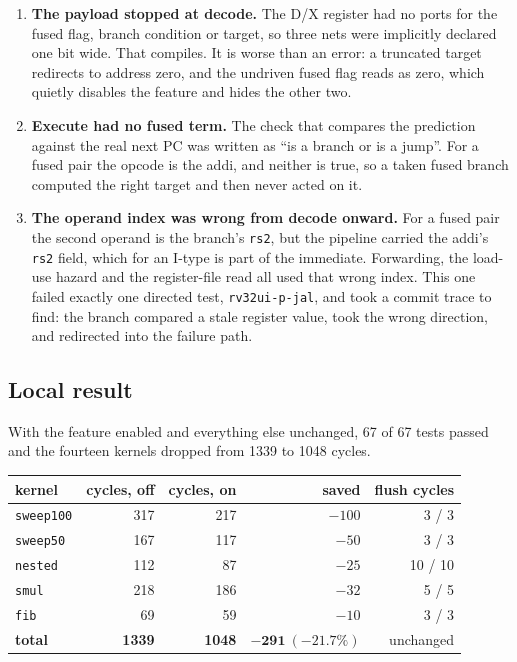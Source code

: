 \documentclass[11pt]{article}
\begin{document}
\begin{enumerate}
\item \textbf{The payload stopped at decode.} The D/X register had no ports for the fused flag,
  branch condition or target, so three nets were implicitly declared one bit wide. That
  compiles. It is worse than an error: a truncated target redirects to address zero, and the
  undriven fused flag reads as zero, which quietly disables the feature and hides the other two.
\item \textbf{Execute had no fused term.} The check that compares the prediction against the
  real next PC was written as ``is a branch or is a jump''. For a fused pair the opcode is the
  addi, and neither is true, so a taken fused branch computed the right target and then never
  acted on it.
\item \textbf{The operand index was wrong from decode onward.} For a fused pair the second
  operand is the branch's \texttt{rs2}, but the pipeline carried the addi's \texttt{rs2} field,
  which for an I-type is part of the immediate. Forwarding, the load-use hazard and the
  register-file read all used that wrong index. This one failed exactly one directed test,
  \texttt{rv32ui-p-jal}, and took a commit trace to find: the branch compared a stale register
  value, took the wrong direction, and redirected into the failure path.
\end{enumerate}

\subsection{Local result}

With the feature enabled and everything else unchanged, 67 of 67 tests passed and the fourteen
kernels dropped from 1339 to 1048 cycles.

\begin{center}
\begin{tabular}{lrrrr}
\toprule
kernel & cycles, off & cycles, on & saved & flush cycles \\
\midrule
\texttt{sweep100} & 317 & 217 & $-100$ & 3 / 3 \\
\texttt{sweep50}  & 167 & 117 & $-50$ & 3 / 3 \\
\texttt{nested}   & 112 &  87 & $-25$ & 10 / 10 \\
\texttt{smul}     & 218 & 186 & $-32$ & 5 / 5 \\
\texttt{fib}      &  69 &  59 & $-10$ & 3 / 3 \\
\textbf{total}    & \textbf{1339} & \textbf{1048} & $\mathbf{-291\ (-21.7\%)}$ & unchanged \\
\bottomrule
\end{tabular}
\end{center}
\end{document}
